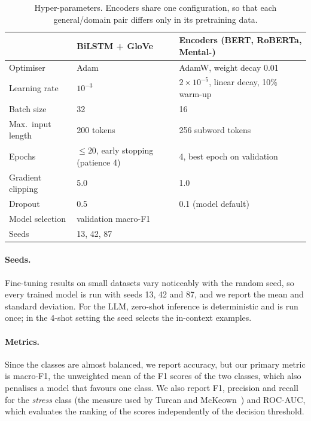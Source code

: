 \begin{table}
  \caption{Hyper-parameters. Encoders share one configuration, so that each general/domain pair
  differs only in its pretraining data.}
  \label{tab:hparams}
  \begin{minipage}{\textwidth}
  \begin{tabular}{lll}
  \hline\hline
  & BiLSTM + GloVe & Encoders (BERT, RoBERTa, Mental-)\\
  \hline
  Optimiser            & Adam             & AdamW, weight decay 0.01\\
  Learning rate        & $10^{-3}$        & $2\times10^{-5}$, linear decay, 10\% warm-up\\
  Batch size           & 32               & 16\\
  Max.\ input length   & 200 tokens       & 256 subword tokens\\
  Epochs               & $\le 20$, early stopping (patience 4) & 4, best epoch on validation\\
  Gradient clipping    & 5.0              & 1.0\\
  Dropout              & 0.5              & 0.1 (model default)\\
  Model selection      & \multicolumn{2}{l}{validation macro-F1}\\
  Seeds                & \multicolumn{2}{l}{13, 42, 87}\\
  \hline\hline
  \end{tabular}
  \end{minipage}
\end{table}

\paragraph{Seeds.} Fine-tuning results on small datasets vary noticeably with the random seed, so
every trained model is run with seeds 13, 42 and 87, and we report the mean and standard deviation.
For the LLM, zero-shot inference is deterministic and is run once; in the 4-shot setting the seed
selects the in-context examples.

\paragraph{Metrics.} Since the classes are almost balanced, we report accuracy, but our primary
metric is macro-F1, the unweighted mean of the F1 scores of the two classes, which also penalises a
model that favours one class. We also report F1, precision and recall for the \emph{stress} class
(the measure used by Turcan and McKeown~) and ROC-AUC, which evaluates the ranking of the
scores independently of the decision threshold.

